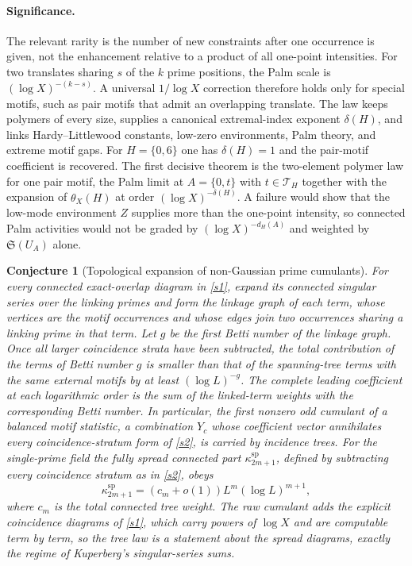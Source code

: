 \documentclass[11pt]{article}
\newtheorem{conjecture}{Conjecture}
\theoremstyle{definition}
\begin{document}
\paragraph{Significance.}
The relevant rarity is the number of new constraints after one occurrence is given, not
the enhancement relative to a product of all one-point intensities.  For two translates
sharing $s$ of the $k$ prime positions, the Palm scale is
$(\log X)^{-(k-s)}$.  A universal $1/\log X$ correction therefore holds
only for special motifs, such as pair motifs that admit an overlapping translate.  The law keeps polymers of
every size, supplies a canonical extremal-index exponent $\delta(H)$, and links
Hardy--Littlewood constants, low-zero environments, Palm theory, and extreme motif gaps.
For $H=\{0,6\}$ one has $\delta(H)=1$ and the pair-motif coefficient is recovered. The first decisive theorem is the two-element polymer law for one pair motif, the Palm limit at $A=\{0,t\}$ with $t\in\mathcal T_H$ together with the expansion of $\theta_X(H)$ at order $(\log X)^{-\delta(H)}$. A failure would show that the low-mode environment $Z$ supplies more than the one-point intensity, so connected Palm activities would not be graded by $(\log X)^{-d_H(A)}$ and weighted by $\mathfrak S(U_A)$ alone.

\begin{conjecture}[Topological expansion of non-Gaussian prime cumulants]\label{s5}
For every connected exact-overlap diagram in \cref{s1}, expand its connected singular series over the linking primes and form the linkage graph of each term, whose vertices are the motif occurrences and whose edges join two occurrences sharing a linking prime in that term.  Let $g$ be the first Betti number of the linkage graph.  Once all larger coincidence strata have been subtracted, the total contribution of the terms of Betti number $g$ is smaller than that of the spanning-tree terms with the same external motifs by at least $(\log L)^{-g}$.  The complete leading coefficient at each logarithmic order is the sum of the linked-term weights with the corresponding Betti number.  In
particular, the first nonzero odd cumulant of a balanced motif statistic, a
combination $Y_c$ whose coefficient vector annihilates every coincidence-stratum form
of \cref{s2}, is carried by
incidence trees.  For the single-prime field the fully spread connected part
$\kappa^{\mathrm{sp}}_{2m+1}$, defined by subtracting every coincidence stratum as in
\cref{s2}, obeys
\[
 \kappa^{\mathrm{sp}}_{2m+1}=(c_m+o(1))L^m(\log L)^{m+1},
\]
where $c_m$ is the total connected tree weight.  The raw cumulant adds the explicit
coincidence diagrams of \cref{s1}, which carry powers of $\log X$ and are computable
term by term, so the tree law is a statement about the spread diagrams, exactly the
regime of Kuperberg's singular-series sums.
\end{conjecture}
\end{document}
